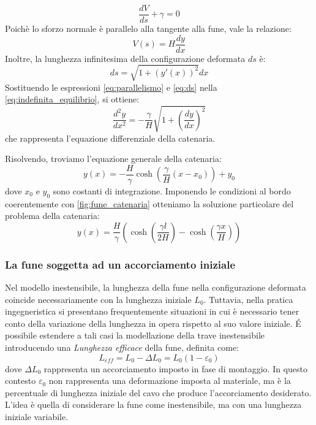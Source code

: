 \begin{equation}
   \frac{dV}{ds} + \gamma = 0 
   \label{eq:indefinita_equilibrio}
\end{equation}
Poichè lo sforzo normale è parallelo alla tangente alla fune, vale la relazione: 
\begin{equation}
   V(s) = H\frac{dy}{dx}
   \label{eq:parallelismo}
\end{equation}
Inoltre, la lunghezza infinitesima della configurazione deformata $ds$ è: 
\begin{equation}
  ds = \sqrt{1 + (y'(x))^{2}} dx
  \label{eq:ds}
\end{equation}
Sostituendo le espressioni \eqref{eq:parallelismo} e \eqref{eq:ds} nella \eqref{eq:indefinita_equilibrio}, si ottiene:
\begin{equation}
   \frac{d^{2}y}{dx^{2}} = - \frac{\gamma}{H} \sqrt{1 + \left( \frac{dy}{dx} \right)^{2}}
\end{equation} 
che rappresenta l'equazione differenziale della catenaria.

Risolvendo, troviamo l'equazione generale della catenaria:
\begin{equation}
   y(x) = - \frac{H}{\gamma} \cosh \left( \frac{\gamma}{H} (x - x_0)\right) + y_0
   \label{eq:equazione_generale_della_catenaria}
\end{equation}
dove $x_0$ e $y_0$ sono costanti di integrazione. Imponendo le condizioni al bordo coerentemente con \cref{fig:fune_catenaria} otteniamo la soluzione particolare del problema della catenaria:
\begin{equation}
   y(x) = \frac{H}{\gamma} \left( \cosh\!\left(\frac{\gamma l}{2H}\right) - \cosh\!\left(\frac{\gamma x}{H}\right) \right)
   \label{eq:equazione_particolare_della_catenaria}
\end{equation}

\subsubsection{La fune soggetta ad un accorciamento iniziale}
Nel modello inestensibile, la lunghezza della fune nella configurazione deformata coincide necessariamente con la lunghezza iniziale $L_0$. Tuttavia, nella pratica ingegneristica si presentano frequentemente situazioni in cui è necessario tener conto della variazione della lunghezza in opera rispetto al suo valore iniziale. 
\'E possibile estendere a tali casi la modellazione della trave inestensibile introducendo una \textit{Lunghezza efficace} della fune, definita come: 
\begin{equation}
    L_{eff} = L_0 - \Delta L_0 = L_0(1 - \varepsilon_0) 
    \label{eq:lunghezza_efficace}
\end{equation}
dove $\Delta L_0$ rappresenta un accorciamento imposto in fase di montaggio. In questo contesto $\varepsilon_0$ non rappresenta una deformazione imposta al materiale, ma è la percentuale di lunghezza iniziale del cavo che produce l'accorciamento desiderato. L'idea è quella di considerare la fune come inestensibile, ma con una lunghezza iniziale variabile. 

